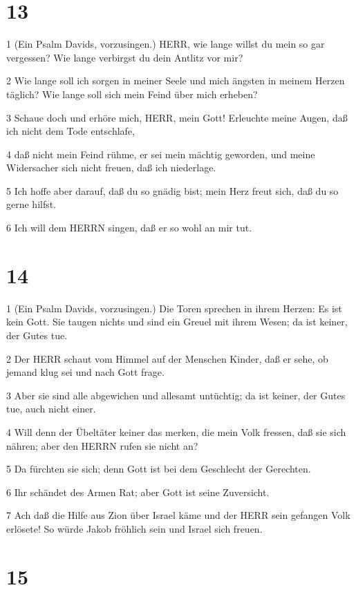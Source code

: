 \chapter{13}

\par 1 (Ein Psalm Davids, vorzusingen.) HERR, wie lange willst du mein so gar vergessen? Wie lange verbirgst du dein Antlitz vor mir?
\par 2 Wie lange soll ich sorgen in meiner Seele und mich ängsten in meinem Herzen täglich? Wie lange soll sich mein Feind über mich erheben?
\par 3 Schaue doch und erhöre mich, HERR, mein Gott! Erleuchte meine Augen, daß ich nicht dem Tode entschlafe,
\par 4 daß nicht mein Feind rühme, er sei mein mächtig geworden, und meine Widersacher sich nicht freuen, daß ich niederlage.
\par 5 Ich hoffe aber darauf, daß du so gnädig bist; mein Herz freut sich, daß du so gerne hilfst.
\par 6 Ich will dem HERRN singen, daß er so wohl an mir tut.

\chapter{14}

\par 1 (Ein Psalm Davids, vorzusingen.) Die Toren sprechen in ihrem Herzen: Es ist kein Gott. Sie taugen nichts und sind ein Greuel mit ihrem Wesen; da ist keiner, der Gutes tue.
\par 2 Der HERR schaut vom Himmel auf der Menschen Kinder, daß er sehe, ob jemand klug sei und nach Gott frage.
\par 3 Aber sie sind alle abgewichen und allesamt untüchtig; da ist keiner, der Gutes tue, auch nicht einer.
\par 4 Will denn der Übeltäter keiner das merken, die mein Volk fressen, daß sie sich nähren; aber den HERRN rufen sie nicht an?
\par 5 Da fürchten sie sich; denn Gott ist bei dem Geschlecht der Gerechten.
\par 6 Ihr schändet des Armen Rat; aber Gott ist seine Zuversicht.
\par 7 Ach daß die Hilfe aus Zion über Israel käme und der HERR sein gefangen Volk erlösete! So würde Jakob fröhlich sein und Israel sich freuen.

\chapter{15}

